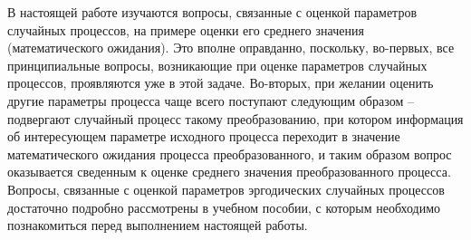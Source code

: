 %
%
%
%
%	
%

В настоящей работе изучаются вопросы, связанные с оценкой параметров случайных процессов, на примере оценки его среднего значения (математического ожидания). Это вполне оправданно, поскольку, во-первых, все принципиальные вопросы, возникающие при оценке параметров случайных процессов, проявляются уже в этой задаче. Во-вторых, при желании оценить другие параметры процесса чаще всего поступают следующим образом – подвергают случайный процесс такому преобразованию, при котором информация об интересующем параметре исходного процесса переходит в значение математического ожидания процесса преобразованного, и таким образом вопрос оказывается сведенным к оценке среднего значения преобразованного процесса.
Вопросы, связанные с оценкой параметров эргодических случайных процессов достаточно подробно рассмотрены в учебном пособии, с которым необходимо познакомиться перед выполнением настоящей работы.

